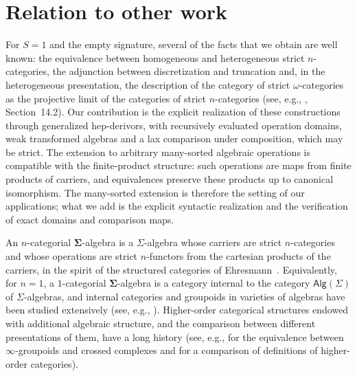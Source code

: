 \documentclass[a4paper, reqno]{amsbook}
\newcommand{\sig}[1]{\mathbf{#1}}             %
\theoremstyle{plain}
\theoremstyle{definition}
\begin{document}
\section{Relation to other work}

For $S=1$ and the empty signature, several of the facts that we obtain are well known: the equivalence between homogeneous and heterogeneous strict $n$-categories, the adjunction between discretization and truncation and, in the heterogeneous presentation, the description of the category of strict $\omega$-categories as the projective limit of the categories of strict $n$-categories (see, e.g., \cite{AraEtAl2025}, Section~14.2).
Our contribution is the explicit realization of these constructions through generalized hep-derivors, with recursively evaluated operation domains, weak transformed algebras and a lax comparison under composition, which may be strict.
The extension to arbitrary many-sorted algebraic operations is compatible with the finite-product structure: such operations are maps from finite products of carriers, and equivalences preserve these products up to canonical isomorphism.
The many-sorted extension is therefore the setting of our applications; what we add is the explicit syntactic realization and the verification of exact domains and comparison maps.

An $n$-categorial $\sig{\Sigma}$-algebra is a $\Sigma$-algebra whose carriers are strict $n$-categories and whose operations are strict $n$-functors from the cartesian products of the carriers, in the spirit of the structured categories of Ehresmann~\cite{Ehresmann1964}.
Equivalently, for $n=1$, a $1$-categorial $\sig{\Sigma}$-algebra is a category internal to the category $\mathsf{Alg}(\Sigma)$ of $\Sigma$-algebras, and internal categories and groupoids in varieties of algebras have been studied extensively (see, e.g., \cite{Bourn2017}).
Higher-order categorical structures endowed with additional algebraic structure, and the comparison between different presentations of them, have a long history (see, e.g., \cite{BrownHiggins1981} for the equivalence between $\infty$-groupoids and crossed complexes and \cite{Leinster2004} for a comparison of definitions of higher-order categories).
\end{document}
